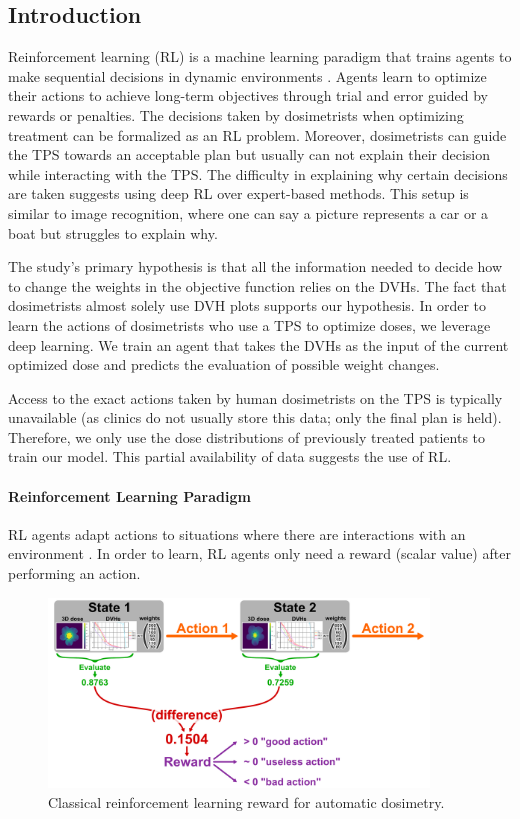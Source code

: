 \subsection{Introduction}
Reinforcement learning (RL) is a machine learning paradigm that trains agents to make sequential decisions in dynamic environments \cite{brooks_what_2021}.
Agents learn to optimize their actions to achieve long-term objectives through trial and error guided by rewards or penalties.
The decisions taken by dosimetrists when optimizing treatment can be formalized as an RL problem.
Moreover, dosimetrists can guide the TPS towards an acceptable plan but usually can not explain their decision while interacting with the TPS.
The difficulty in explaining why certain decisions are taken suggests using deep RL over expert-based methods.
This setup is similar to image recognition, where one can say a picture represents a car or a boat but struggles to explain why.

The study’s primary hypothesis is that all the information needed to decide how to change the weights in the objective function relies on the DVHs.
The fact that dosimetrists almost solely use DVH plots supports our hypothesis.
In order to learn the actions of dosimetrists who use a TPS to optimize doses, we leverage deep learning.
We train an agent that takes the DVHs as the input of the current optimized dose and predicts the evaluation of possible weight changes.

Access to the exact actions taken by human dosimetrists on the TPS is typically unavailable (as clinics do not usually store this data; only the final plan is held).
Therefore, we only use the dose distributions of previously treated patients to train our model.
This partial availability of data suggests the use of RL.

\paragraph{Reinforcement Learning Paradigm}
RL agents adapt actions to situations where there are interactions with an environment \cite{Kaelbling1996}.
In order to learn, RL agents only need a reward (scalar value) after performing an action. 

\begin{figure}
	\centering
	\includegraphics[width=0.9\textwidth]{AIME/reward.pdf}
	\caption{Classical reinforcement learning reward for automatic dosimetry.}
	\label{fig:reward_fig}
\end{figure}

